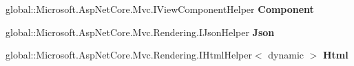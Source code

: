 \begin{DoxyCompactItemize}
global\+::\+Microsoft.\+Asp\+Net\+Core.\+Mvc.\+I\+View\+Component\+Helper {\bfseries Component}
\item 
\mbox{\label{class_asp_net_core_1_1_views___shared____sidebar_addf745e4e9a7e8ea5013b54fccee4643}} 
global\+::\+Microsoft.\+Asp\+Net\+Core.\+Mvc.\+Rendering.\+I\+Json\+Helper {\bfseries Json}
\item 
\mbox{\label{class_asp_net_core_1_1_views___shared____sidebar_aff0410303db74e085557a219be7ff6e8}} 
global\+::\+Microsoft.\+Asp\+Net\+Core.\+Mvc.\+Rendering.\+I\+Html\+Helper$<$ dynamic $>$ {\bfseries Html}
\end{DoxyCompactItemize}
